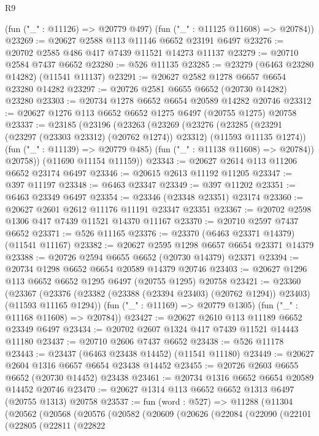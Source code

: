 \begin{lexlean}{R9}
\begin{coremodule}
      (fun ("_" : @11126) => @20779 @497)
      (fun ("_" : @11125 @11608) => @20784))
@23269 := @20627 @2588 @113 @11146 @6652 @23191 @6497
@23276 := @20702 @2585 @486 @417 @7439 @11521 @14273 @11137
@23279 := @20710 @2584 @7437 @6652
@23280 := @526 @11135
@23285 := @23279 (@6463 @23280 @14282) (@11541 @11137)
@23291 := @20627 @2582 @1278 @6657 @6654 @23280 @14282
@23297 := @20726 @2581 @6655 @6652 (@20730 @14282) @23280
@23303 := @20734 @1278 @6652 @6654 @20589 @14282 @20746
@23312 := @20627 @1276 @113 @6652 @6652 @1275 @6497 (@20755 @1275) @20758
@23337 := @23185
    (@23196
      (@23263
        (@23269
          (@23276
            (@23285 (@23291 (@23297 (@23303 @23312) (@20762 @1274)) @23312) (@11593 @11135 @1274))
            (fun ("_" : @11139) => @20779 @485)
            (fun ("_" : @11138 @11608) => @20784))
          @20758))
      (@11690 @11154 @11159))
@23343 := @20627 @2614 @113 @11206 @6652 @23174 @6497
@23346 := @20615 @2613 @11192 @11205
@23347 := @397 @11197
@23348 := @6463 @23347
@23349 := @397 @11202
@23351 := @6463 @23349 @6497
@23354 := @23346 (@23348 @23351) @23174
@23360 := @20627 @2601 @2612 @11176 @11191 @23347 @23351
@23367 := @20702 @2598 @1306 @417 @7439 @11521 @14370 @11167
@23370 := @20710 @2597 @7437 @6652
@23371 := @526 @11165
@23376 := @23370 (@6463 @23371 @14379) (@11541 @11167)
@23382 := @20627 @2595 @1298 @6657 @6654 @23371 @14379
@23388 := @20726 @2594 @6655 @6652 (@20730 @14379) @23371
@23394 := @20734 @1298 @6652 @6654 @20589 @14379 @20746
@23403 := @20627 @1296 @113 @6652 @6652 @1295 @6497 (@20755 @1295) @20758
@23421 := @23360
    (@23367
      (@23376 (@23382 (@23388 (@23394 @23403) (@20762 @1294)) @23403) (@11593 @11165 @1294))
      (fun ("_" : @11169) => @20779 @1305)
      (fun ("_" : @11168 @11608) => @20784))
@23427 := @20627 @2610 @113 @11189 @6652 @23349 @6497
@23434 := @20702 @2607 @1324 @417 @7439 @11521 @14443 @11180
@23437 := @20710 @2606 @7437 @6652
@23438 := @526 @11178
@23443 := @23437 (@6463 @23438 @14452) (@11541 @11180)
@23449 := @20627 @2604 @1316 @6657 @6654 @23438 @14452
@23455 := @20726 @2603 @6655 @6652 (@20730 @14452) @23438
@23461 := @20734 @1316 @6652 @6654 @20589 @14452 @20746
@23470 := @20627 @1314 @113 @6652 @6652 @1313 @6497 (@20755 @1313) @20758
@23537 := fun (word : @527) =>
  @11288
    (@11304
      (@20562
        (@20568
          (@20576
            (@20582
              (@20609
                (@20626
                  (@22084
                    (@22090
                      (@22101
                        (@22805
                          (@22811
                            (@22822

\end{coremodule}
\end{lexlean}

